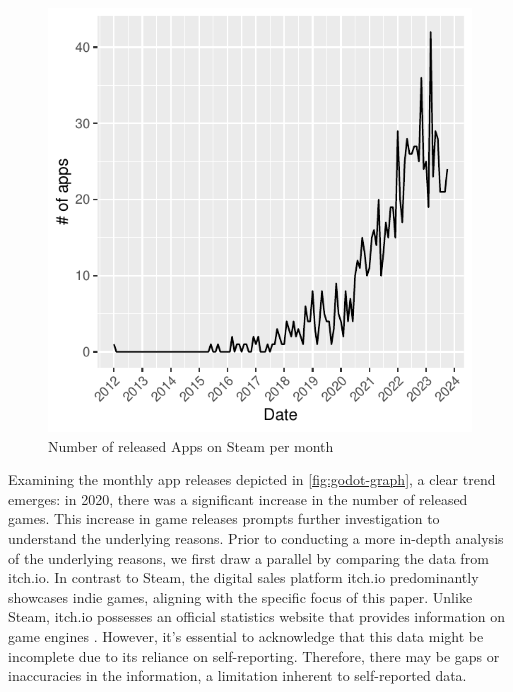 \begin{figure}[ht!]
    \begin{center}
        \includegraphics[width=1\columnwidth]{figures/godot-graph.pdf}
        \caption{\label{fig:godot-graph} Number of released Apps on Steam per month}
    \end{center}
\end{figure}

Examining the monthly app releases depicted in \autoref{fig:godot-graph}, a clear trend emerges: in 2020, there was a significant increase in the number of released games.
This increase in game releases prompts further investigation to understand the underlying reasons.
Prior to conducting a more in-depth analysis of the underlying reasons, we first draw a parallel by comparing the data from itch.io.
In contrast to Steam, the digital sales platform itch.io predominantly showcases indie games, aligning with the specific focus of this paper.
Unlike Steam, itch.io possesses an official statistics website that provides information on game engines \cite{itchio-engines}.
However, it's essential to acknowledge that this data might be incomplete due to its reliance on self-reporting.
Therefore, there may be gaps or inaccuracies in the information, a limitation inherent to self-reported data. \\


